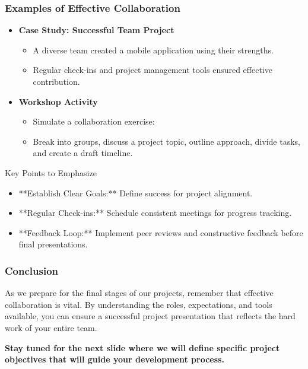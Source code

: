 \documentclass[aspectratio=169]{beamer}
\begin{document}
\begin{frame}[fragile]
    \frametitle{Examples of Effective Collaboration}
    \begin{itemize}
        \item \textbf{Case Study: Successful Team Project}
            \begin{itemize}
                \item A diverse team created a mobile application using their strengths.
                \item Regular check-ins and project management tools ensured effective contribution.
            \end{itemize} 
        \item \textbf{Workshop Activity}
            \begin{itemize}
                \item Simulate a collaboration exercise: 
                \item Break into groups, discuss a project topic, outline approach, divide tasks, and create a draft timeline.
            \end{itemize}
    \end{itemize}

    \begin{block}{Key Points to Emphasize}
        \begin{itemize}
            \item **Establish Clear Goals:** Define success for project alignment.
            \item **Regular Check-ins:** Schedule consistent meetings for progress tracking.
            \item **Feedback Loop:** Implement peer reviews and constructive feedback before final presentations.
        \end{itemize}
    \end{block}
\end{frame}

\begin{frame}[fragile]
    \frametitle{Conclusion}
    As we prepare for the final stages of our projects, remember that effective collaboration is vital. By understanding the roles, expectations, and tools available, you can ensure a successful project presentation that reflects the hard work of your entire team. 

    \textbf{Stay tuned for the next slide where we will define specific project objectives that will guide your development process.}
\end{frame}
\end{document}
